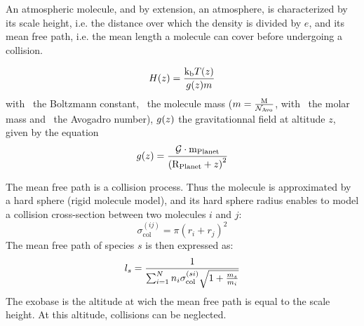 An atmospheric molecule, and by extension, an atmosphere, is characterized by
its scale height, i.e. the distance over which the density is divided by $e$, and
its mean free path, i.e. the mean length a molecule can cover before undergoing
a collision.

\begin{equation}
H(z) = \frac{\text{k}_\text{b} T(z)}{g(z)m}
\label{scale_height}
\end{equation}
with \kb\ the Boltzmann constant, 
\mass\ the molecule mass ($m = \frac{\text{M}}{\mathcal{N}_\text{Avo}}$, with
\Mm\ the molar mass and \Nav\ the Avogadro number), 
$g(z)$ the gravitationnal field at altitude $z$, given by the equation
\begin{equation}
g(z) = \frac{\mathcal{G}\cdot\text{m}_\text{Planet}}{\left(\text{R}_\text{Planet} + z\right)^2}
\label{gfield}
\end{equation}

The mean free path is a collision process. Thus the molecule is approximated
by a hard sphere (rigid molecule model), and its hard sphere radius enables
to model a collision cross-section between two molecules $i$ and $j$:
\begin{equation}
\sigma^{(ij)}_\text{col} = \pi\left(r_i + r_j\right)^2
\label{sigma_collision}
\end{equation}
The mean free path of species $s$ is then expressed as:
\begin{equation}
l_s = \frac{1}{\sum_{i=1}^{N}n_i\sigma^{(si)}_\text{col}\sqrt{1 + \frac{m_s}{m_i}}}
\label{mean_free_path}
\end{equation}
The exobase is the altitude at wich the mean free path is equal to the scale height. At this
altitude, collisions can be neglected.
